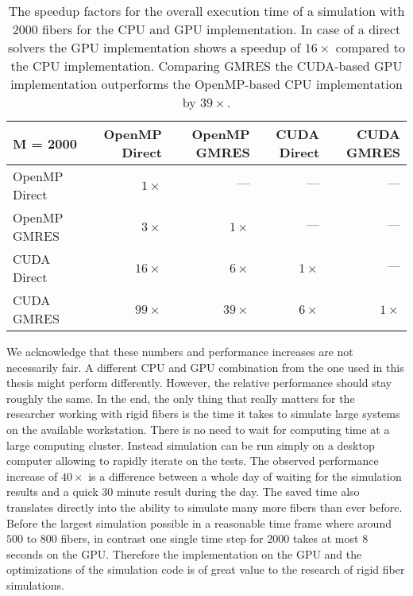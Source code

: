 \begin{table}[!htbp]
  \begin{center}
    \begin{tabulary}{\textwidth}{lRRRR}
      \toprule
      M = 2000 & OpenMP Direct & OpenMP GMRES & CUDA Direct & CUDA GMRES \\
      \midrule
      OpenMP Direct & $1×$  & $—$   & $—$ & $—$ \\
      OpenMP GMRES  & $3×$  & $1×$  & $—$ & $—$ \\
      CUDA Direct   & $16×$ & $6×$  & $1×$ & $—$ \\
      CUDA GMRES    & $99×$ & $39×$ & $6×$ & $1×$ \\
      \bottomrule
    \end{tabulary}
  \end{center}
  \caption[Speedup factors for overall execution time.]{The speedup factors for the overall execution time of a simulation with $2000$ fibers for the CPU and GPU implementation. In case of a direct solvers the GPU implementation shows a speedup of $16×$ compared to the CPU implementation. Comparing GMRES the CUDA-based GPU implementation outperforms the OpenMP-based CPU implementation by $39×$.}
  \label{tab:overall_speedup}
\end{table}

We acknowledge that these numbers and performance increases are not necessarily fair. A different CPU and GPU combination from the one used in this thesis might perform differently. However, the relative performance should stay roughly the same. In the end, the only thing that really matters for the researcher working with rigid fibers is the time it takes to simulate large systems on the available workstation. There is no need to wait for computing time at a large computing cluster. Instead simulation can be run simply on a desktop computer allowing to rapidly iterate on the tests. The observed performance increase of $40×$ is a difference between a whole day of waiting for the simulation results and a quick $30$ minute result during the day. The saved time also translates directly into the ability to simulate many more fibers than ever before. Before the largest simulation possible in a reasonable time frame where around $500$ to $800$ fibers, in contrast one single time step for $2000$ takes at most $8$ seconds on the GPU. Therefore the implementation on the GPU and the optimizations of the simulation code is of great value to the research of rigid fiber simulations.
